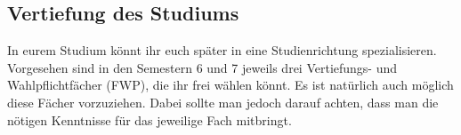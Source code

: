 \subsection{Vertiefung des Studiums}
In eurem Studium könnt ihr euch später in eine Studienrichtung 
spezialisieren. Vorgesehen sind in den Semestern 6 und 7 jeweils drei 
Vertiefungs- und Wahlpflichtfächer (FWP), die ihr frei wählen könnt. Es 
ist natürlich auch möglich diese Fächer vorzuziehen. Dabei sollte man jedoch 
darauf achten, dass man die nötigen Kenntnisse für das jeweilige Fach 
mitbringt. 